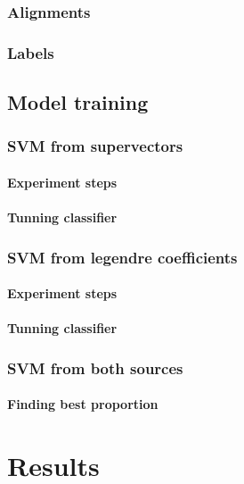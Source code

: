 \documentclass[11pt,a4paper]{tesis}
\begin{document}
		\subsection{Alignments}
			
		\subsection{Labels}
			
	\section{Model training}
		\subsection{SVM from supervectors}
			\subsubsection{Experiment steps}
				
			\subsubsection{Tunning classifier}
				
		\subsection{SVM from legendre coefficients}
			\subsubsection{Experiment steps}
				
			\subsubsection{Tunning classifier}
				
		\subsection{SVM from both sources}
			\subsubsection{Finding best proportion}

\chapter{Results}
\end{document}
